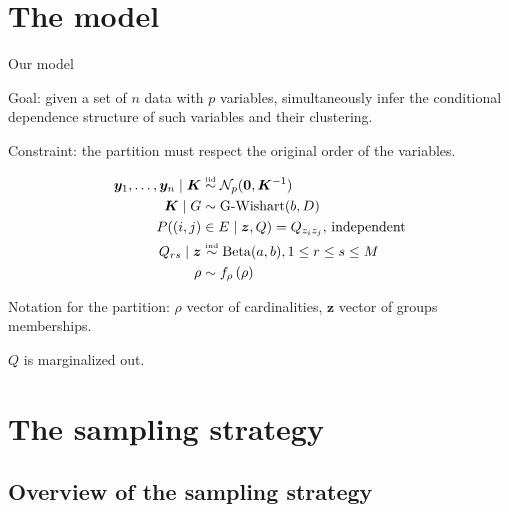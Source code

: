 
\section{The model}

\begin{frame}{Our model}

\alert{Goal}: given a set of $n$ data with $p$ variables, simultaneously infer the conditional dependence structure of such variables and their clustering.

\pause

\alert{Constraint}: the partition must respect the original order of the variables.

\pause

\begin{align*}
    \bm{y}_1, \ldots, \bm{y}_n \mid \bm{K} & \overset{\text{\tiny{iid}}}{\sim} \mathcal{N}_p(\mathbf{0}, \bm{K}^{-1} ) \\
    \bm{K} \mid G & \sim \operatorname{G-Wishart}(b, D)\\
    P((i,j)&\in E\mid \bm{z},Q) = Q_{z_{i} z_{j}},\,\text{independent}\\
        Q_{rs} \mid \bm{z} &\overset{\text{\tiny{ind}}}{\sim} \operatorname{Beta}(a,b), 1\leq r\leq s\leq M\\
    \rho & \sim f_{\rho} \left(\rho\right)
\end{align*}

Notation for the partition: $\rho$ vector of cardinalities, $\bm{z}$ vector of groups memberships.

\end{frame}

\begin{frame}

$Q$ is marginalized out.


\end{frame}

\section{The sampling strategy}

\subsection{Overview of the sampling strategy}

